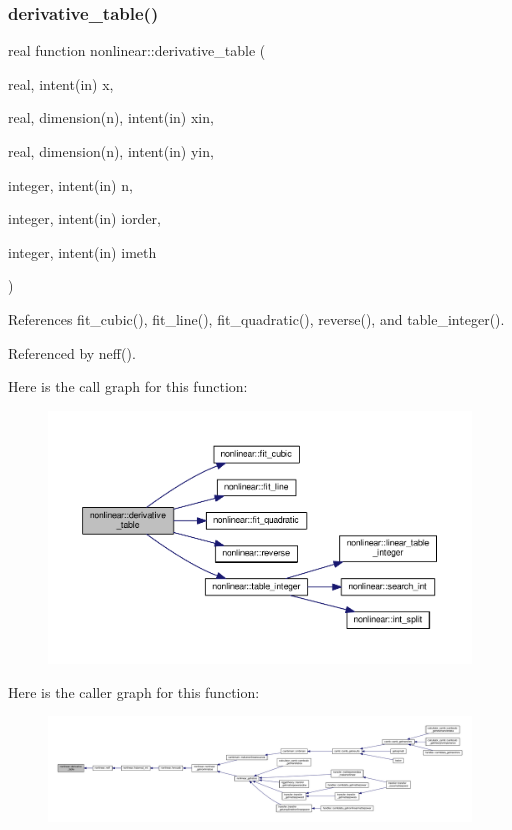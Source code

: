 \subsubsection{\texorpdfstring{derivative\+\_\+table()}{derivative\_table()}}
{\footnotesize\ttfamily real function nonlinear\+::derivative\+\_\+table (\begin{DoxyParamCaption}\item[{real, intent(in)}]{x,  }\item[{real, dimension(n), intent(in)}]{xin,  }\item[{real, dimension(n), intent(in)}]{yin,  }\item[{integer, intent(in)}]{n,  }\item[{integer, intent(in)}]{iorder,  }\item[{integer, intent(in)}]{imeth }\end{DoxyParamCaption})\hspace{0.3cm}{\ttfamily [private]}}



References fit\+\_\+cubic(), fit\+\_\+line(), fit\+\_\+quadratic(), reverse(), and table\+\_\+integer().



Referenced by neff().

Here is the call graph for this function\+:
\nopagebreak
\begin{figure}[H]
\begin{center}
\leavevmode
\includegraphics[width=350pt]{namespacenonlinear_aaa7e906c253a54ffb73bab9e5dfd1397_cgraph}
\end{center}
\end{figure}
Here is the caller graph for this function\+:
\nopagebreak
\begin{figure}[H]
\begin{center}
\leavevmode
\includegraphics[width=350pt]{namespacenonlinear_aaa7e906c253a54ffb73bab9e5dfd1397_icgraph}
\end{center}
\end{figure}
\mbox{\label{namespacenonlinear_ae44a5c4f7412d42923e10f9a241d2e74}} 

